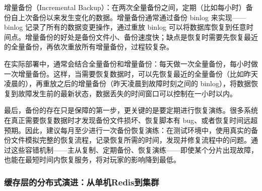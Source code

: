 增量备份（Incremental Backup）：在两次全量备份之间，定期（比如每小时）备份自上次备份以来发生变化的数据。增量备份通常通过备份 binlog 来实现——binlog 记录了所有的数据变更操作，通过重放 binlog 可以将数据库恢复到任意时间点。增量备份的好处是备份文件小、备份速度快；缺点是恢复时需要先恢复最近的全量备份，再依次重放所有增量备份，过程较复杂。

在实际部署中，通常会结合全量备份和增量备份：每天做一次全量备份，每小时做一次增量备份。这样，当需要恢复数据时，可以先恢复最近的全量备份（比如昨天凌晨的），再重放之后的增量备份（昨天凌晨到故障时刻之间的 binlog），将数据恢复到故障发生前的最新状态，数据丢失的时间窗口可以控制在一小时以内。

最后，备份的存在只是保障的第一步，更关键的是要定期进行恢复演练。很多系统在真正需要恢复数据时才发现备份文件损坏、恢复脚本有 bug、或者恢复时间远超预期。因此，建议每月至少进行一次备份恢复演练：在测试环境中，使用真实的备份文件模拟完整的恢复流程，记录恢复所需的时间，发现并修复流程中的问题。通过这些容错机制——主从复制、定期备份、恢复演练——即使某个分片出现故障，也能在最短时间内恢复服务，将对玩家的影响降到最低。



\subsubsection{缓存层的分布式演进：从单机Redis到集群}




